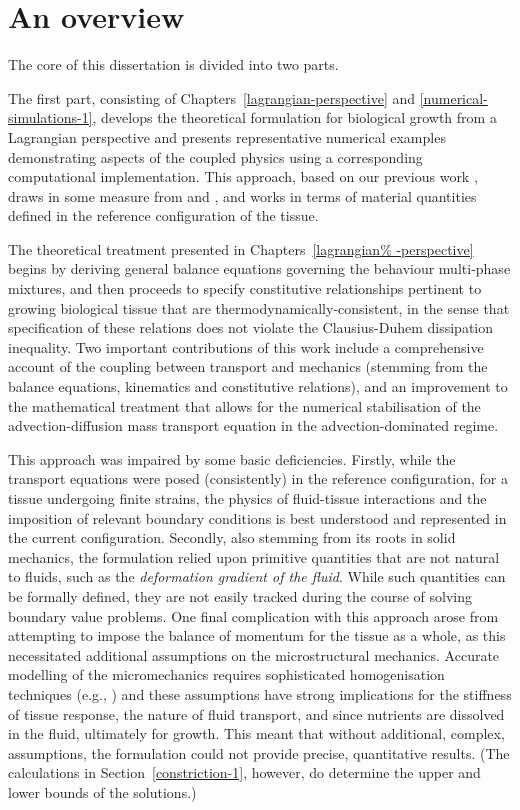 \section{An overview}
\label{overview}

The core of this dissertation is divided into two parts.

The first part, consisting of Chapters~\ref{lagrangian-perspective}
and \ref{numerical-simulations-1}, develops the theoretical
formulation for biological growth from a Lagrangian perspective and
presents representative numerical examples demonstrating aspects of
the coupled physics using a corresponding computational
implementation. This approach, based on our previous work
\citep{growthpaper}, draws in some measure from
\citet{CowinHegedus:76, EpsteinMaugin:2000} and
\citet{TaberHumphrey:2001}, and works in terms of material quantities
defined in the reference configuration of the tissue.

The theoretical treatment presented in Chapters~\ref{lagrangian%
  -perspective} begins by deriving general balance equations governing
the behaviour multi-phase mixtures, and then proceeds to specify
constitutive relationships pertinent to growing biological tissue that
are thermody\-namically-consistent, in the sense that specification of
these relations does not violate the Clausius-Duhem dissipation
inequality. Two important contributions of this work include a
comprehensive account of the coupling between transport and mechanics
(stemming from the balance equations, kinematics and constitutive
relations), and an improvement to the mathematical treatment that
allows for the numerical stabilisation of the advection-diffusion mass
transport equation in the advection-dominated regime.

This approach was impaired by some basic deficiencies. Firstly, while
the transport equations were posed (consistently) in the reference
configuration, for a tissue undergoing finite strains, the physics of
fluid-tissue interactions and the imposition of relevant boundary
conditions is best understood and represented in the current
configuration.  Secondly, also stemming from its roots in solid
mechanics, the formulation relied upon primitive quantities that are
not natural to fluids, such as the {\em deformation gradient of the
  fluid}. While such quantities can be formally defined, they are not
easily tracked during the course of solving boundary value
problems. One final complication with this approach arose from
attempting to impose the balance of momentum for the tissue as a
whole, as this necessitated additional assumptions on the
microstructural mechanics. Accurate modelling of the micromechanics
requires sophisticated homogenisation techniques (e.g.,
\citet{IdiartCastaneda:2003}) and these assumptions have strong
implications for the stiffness of tissue response, the nature of fluid
transport, and since nutrients are dissolved in the fluid, ultimately
for growth. This meant that without additional, complex, assumptions,
the formulation could not provide precise, quantitative results. (The
calculations in Section~\ref{constriction-1}, however, do determine
the upper and lower bounds of the solutions.)

